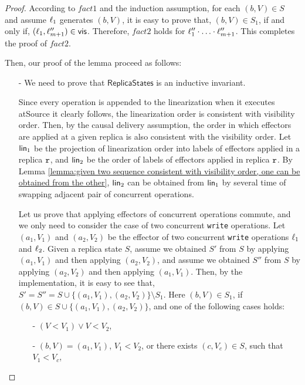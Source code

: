 \begin {proof}
According to $fact1$ and the induction assumption, for each $(b,V) \in S$ and assume $\ell_1$ generates $(b,V)$, it is easy to prove that, $(b,V) \in S_1$, if and only if, $(\ell_1,\ell''_{m+1}) \in \mathsf{vis}$. Therefore, $fact2$ holds for $\ell''_1 \cdot \ldots \cdot \ell''_{m+1}$. This completes the proof of $fact2$.


Then, our proof of the lemma proceed as follows:

\begin{itemize}
\setlength{\itemsep}{0.5pt}
\item[-] We need to prove that $\mathsf{ReplicaStates}$ is an inductive invariant.

Since every operation is appended to the linearization when it executes atSource it clearly follows, the linearization order is consistent with visibility order. Then, by the causal delivery assumption, the order in which effectors are applied at a given replica is also consistent with the visibility order. Let $\mathsf{lin}_1$ be the projection of linearization order into labels of effectors applied in a replica $\mathtt{r}$, and $\mathsf{lin}_2$ be the order of labels of effectors applied in replica $\mathtt{r}$. By Lemma \ref{lemma:given two sequence consistent with visibility order, one can be obtained from the other}, $\mathsf{lin}_2$ can be obtained from $\mathsf{lin}_1$ by several time of swapping adjacent pair of concurrent operations.

Let us prove that applying effectors of concurrent operations commute, and we only need to consider the case of two concurrent {\tt write} operations. Let $(a_1,V_1)$ and $(a_2,V_2)$ be the effector of two concurrent {\tt write} operations $\ell_1$ and $\ell_2$. Given a replica state $S$, assume we obtained $S'$ from $S$ by applying $(a_1,V_1)$ and then applying $(a_2,V_2)$, and assume we obtained $S''$ from $S$ by applying $(a_2,V_2)$ and then applying $(a_1,V_1)$. Then, by the implementation, it is easy to see that, $S' = S'' = S \cup \{ (a_1,V_1),(a_2,V_2) \} \setminus S_1$. Here $(b,V) \in S_1$, if $(b,V) \in S \cup \{ (a_1,V_1),(a_2,V_2) \}$, and one of the following cases holds:

    \begin{itemize}
    \setlength{\itemsep}{0.5pt}
    \item[-] $(V < V_1) \vee V < V_2$,

    \item[-] $(b,V) = (a_1,V_1)$, $V_1 < V_2$, or there exists $(c,V_c) \in S$, such that $V_1 < V_c$,


\end{itemize}
\end{itemize}
\end{proof}
